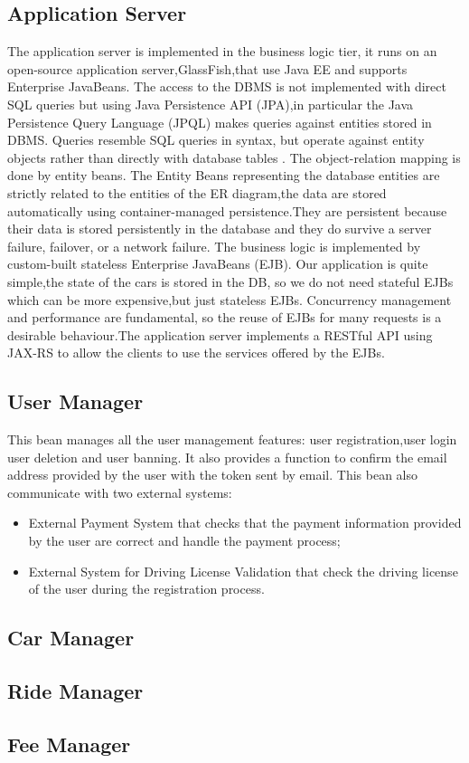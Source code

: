 \subsection{Application Server}
The application server is implemented in the business logic tier, it runs on an open-source application server,GlassFish,that use Java EE and supports Enterprise JavaBeans. The access to the DBMS is not implemented with direct SQL queries but using Java Persistence API (JPA),in particular the Java Persistence Query Language (JPQL) makes queries against entities stored in DBMS. Queries resemble SQL queries in syntax, but operate against entity objects rather than directly with database tables . The object-relation mapping is done by entity beans. The Entity Beans representing the database entities are strictly related to the entities of the ER diagram,the data  are stored automatically using container-managed persistence.They are persistent because their data is stored persistently in the database and they do survive a server failure, failover, or a network failure. The business logic is implemented by custom-built stateless Enterprise JavaBeans (EJB). Our application is quite simple,the state of the cars is stored in the DB, so we do not need stateful EJBs which can be more expensive,but just stateless EJBs. Concurrency management and performance are fundamental, so the reuse of EJBs for many requests is a desirable behaviour.The application server implements a RESTful API using JAX-RS to allow the clients to use the services offered by the EJBs.

\subsection{User Manager}
This bean manages all the user management features: user registration,user login user deletion and user banning. It also provides a function to confirm the email address provided by the user with the token sent by email. This bean also communicate with two external systems:
\begin{itemize}
\item External Payment System that checks that the payment information provided by the user are correct and handle the payment process;
\item  External System for Driving License Validation that check the driving license of the user during the registration process.
\end{itemize}

\subsection{Car Manager}

\subsection{Ride Manager}

\subsection{Fee Manager}

